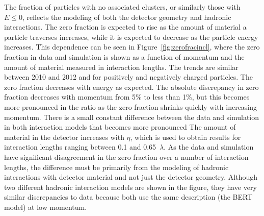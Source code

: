 The fraction of particles with no associated clusters, or similarly those with $E \leq 0$, reflects the modeling of both the detector geometry and hadronic interactions.
The zero fraction is expected to rise as the amount of material a particle traverses increases, while it is expected to decrease as the particle energy increases.
This dependence can be seen in Figure~\ref{fig:zerofracincl}, where the zero fraction in data and simulation is shown as a function of momentum and the amount of material measured in interaction lengths.
The trends are similar between 2010 and 2012 and for positively and negatively charged particles.
The zero fraction decreases with energy as expected.
The absolute discrepancy in zero fraction decreases with momentum from 5\% to less than 1\%, but this becomes more pronounced in the ratio as the zero fraction shrinks quickly with increasing momentum.
There is a small constant difference between the data and simulation in both interaction models that becomes more pronounced 
The amount of material in the detector increases with $\eta$, which is used to obtain results for interaction lengths ranging between 0.1 and 0.65~$\lambda$.
As the data and simulation have significant disagreement in the zero fraction over a number of interaction lengths, the difference must be primarily from the modeling of hadronic interactions with detector material and not just the detector geometry.
Although two different hadronic interaction models are shown in the figure, they have very similar discrepancies to data because both use the same description (the BERT model) at low momentum.

